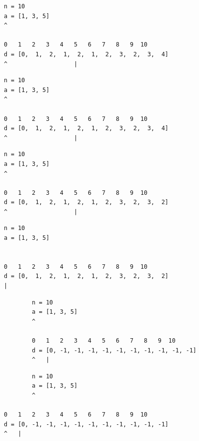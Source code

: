 \begin{frame}[fragile]
\begin{verbatim}
n = 10
a = [1, 3, 5]
^

0   1   2   3   4   5   6   7   8   9  10
d = [0,  1,  2,  1,  2,  1,  2,  3,  2,  3,  4]
^                   |
\end{verbatim}
\end{frame}
\addtocounter{framenumber}{-1}

\begin{frame}[fragile]
\begin{verbatim}
n = 10
a = [1, 3, 5]
^

0   1   2   3   4   5   6   7   8   9  10
d = [0,  1,  2,  1,  2,  1,  2,  3,  2,  3,  4]
^                   |
\end{verbatim}
\end{frame}
\addtocounter{framenumber}{-1}

\begin{frame}[fragile]
\begin{verbatim}
n = 10
a = [1, 3, 5]
^

0   1   2   3   4   5   6   7   8   9  10
d = [0,  1,  2,  1,  2,  1,  2,  3,  2,  3,  2]
^                   |
\end{verbatim}
\end{frame}
\addtocounter{framenumber}{-1}

\begin{frame}[fragile]
\begin{verbatim}
n = 10
a = [1, 3, 5]


0   1   2   3   4   5   6   7   8   9  10
d = [0,  1,  2,  1,  2,  1,  2,  3,  2,  3,  2]
|
\end{verbatim}
        \end{frame}

        \begin{frame}[fragile]
        \begin{verbatim}
        n = 10
        a = [1, 3, 5]
        ^

        0   1   2   3   4   5   6   7   8   9  10
        d = [0, -1, -1, -1, -1, -1, -1, -1, -1, -1, -1]
        ^   |
        \end{verbatim}
        \end{frame}
        \addtocounter{framenumber}{-1}

        \begin{frame}[fragile]
        \begin{verbatim}
        n = 10
        a = [1, 3, 5]
        ^

0   1   2   3   4   5   6   7   8   9  10
d = [0, -1, -1, -1, -1, -1, -1, -1, -1, -1, -1]
^   |
\end{verbatim}
\end{frame}
\addtocounter{framenumber}{-1}

